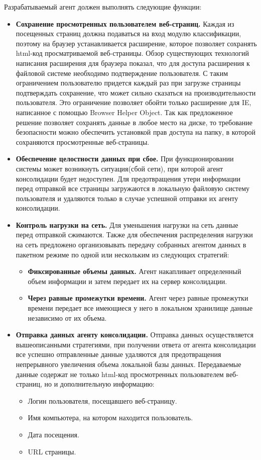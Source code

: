 \documentclass[russian, utf8, emptystyle]{eskdtext}
\begin{document}
Разрабатываемый агент должен выполнять следующие функции:
\begin{itemize}
	\item {\bf Сохранение просмотренных пользователем веб-страниц.} Каждая из посещенных страниц должна подаваться на вход модулю классификации, поэтому на браузер устанавливается расширение, которое позволяет сохранять html-код просматриваемой веб-страницы. Обзор существующих технологий написания расширения для браузера показал, что для доступа расширения к файловой системе необходимо подтверждение пользователя. С таким ограничением пользователю придется каждый раз при загрузке страницы подтверждать сохранение, что может сильно сказаться на производительности пользователя. 	Это ограничение позволяет обойти только расширение для IE, написанное с помощью Browser Helper Object. Так как предложенное решение позволяет сохранять данные в любое место на диске, то требование безопасности можно обеспечить установкой прав доступа на папку, в которой сохраняются просмотренные веб-страницы.
	\item {\bf Обеспечение целостности данных при сбое.}
	При функционировании системы может возникнуть ситуация(сбой сети), при которой агент консолидации будет недоступен. Для предотвращения утери информации перед отправкой все страницы загружаются в локальную файловую систему пользователя и удаляются только в случае успешной отправки их агенту консолидации.
	\item {\bf Контроль нагрузки на сеть.} Для уменьшения нагрузки на сеть данные перед отправкой сжимаются. Также для обеспечения распределения нагрузки на сеть  предложено организовывать передачу собранных агентом данных в пакетном режиме по одной или нескольким из следующих стратегий:
	\begin{itemize}
	\item {\bf Фиксированные объемы данных.} Агент накапливает определенный объем информации и затем передает их на сервер консолидации.
	\item {\bf Через равные промежутки времени.} Агент через равные промежутки времени передает все имеющиеся у него в локальном хранилище данные независимо от их объема.
\end{itemize}
	\item {\bf Отправка данных агенту консолидации.} Отправка данных осуществляется вышеописанными стратегиями, при получении ответа от агента консолидации все успешно отправленные данные удаляются для предотвращения непрерывного увеличения объема локальной базы данных. Передаваемые данные содержат не только html-код просмотренных пользователем веб-страниц, но и дополнительную информацию:
	\begin{itemize}
			\item Логин пользователя, посещавшего веб-страницу.
			\item Имя компьютера, на котором находится пользователь.
			\item Дата посещения.
			\item URL страницы.
	\end{itemize}
\end{itemize}
\end{document}
